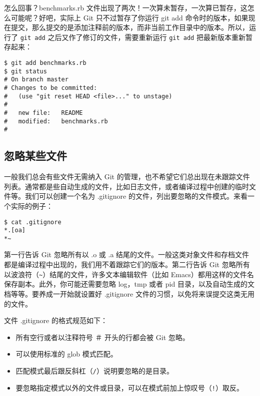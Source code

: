 \documentclass[a4paper]{book}
\begin{document}
怎么回事？benchmarks.rb 文件出现了两次！一次算未暂存，一次算已暂存，这怎么可能呢？好吧，实际上 Git 只不过暂存了你运行 git add 命令时的版本，如果现在提交，那么提交的是添加注释前的版本，而非当前工作目录中的版本。所以，运行了 \texttt{git add} 之后又作了修订的文件，需要重新运行 \texttt{git add} 把最新版本重新暂存起来：

\begin{shaded}\begin{verbatim}
$ git add benchmarks.rb
$ git status
# On branch master
# Changes to be committed:
#   (use "git reset HEAD <file>..." to unstage)
#
#	new file:   README
#	modified:   benchmarks.rb
#
\end{verbatim}\end{shaded}

\subsection{忽略某些文件}

一般我们总会有些文件无需纳入 Git 的管理，也不希望它们总出现在未跟踪文件列表。通常都是些自动生成的文件，比如日志文件，或者编译过程中创建的临时文件等。我们可以创建一个名为 .gitignore 的文件，列出要忽略的文件模式。来看一个实际的例子：

\begin{shaded}\begin{verbatim}
$ cat .gitignore
*.[oa]
*~
\end{verbatim}\end{shaded}

第一行告诉 Git 忽略所有以 .o 或 .a 结尾的文件。一般这类对象文件和存档文件都是编译过程中出现的，我们用不着跟踪它们的版本。第二行告诉 Git 忽略所有以波浪符（\texttt{\textasciitilde{}}）结尾的文件，许多文本编辑软件（比如 Emacs）都用这样的文件名保存副本。此外，你可能还需要忽略 log，tmp 或者 pid 目录，以及自动生成的文档等等。要养成一开始就设置好 .gitignore 文件的习惯，以免将来误提交这类无用的文件。

文件 .gitignore 的格式规范如下：

\begin{itemize}
\itemsep1pt\parskip0pt
\item
  所有空行或者以注释符号 ＃ 开头的行都会被 Git 忽略。
\item
  可以使用标准的 glob 模式匹配。
\item
  匹配模式最后跟反斜杠（\texttt{/}）说明要忽略的是目录。
\item
  要忽略指定模式以外的文件或目录，可以在模式前加上惊叹号（\texttt{!}）取反。
\end{itemize}
\end{document}

